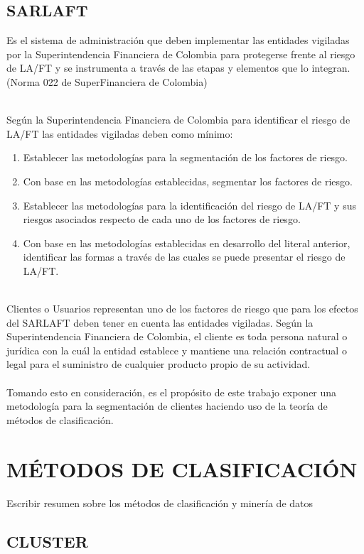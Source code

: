 \documentclass[letterpaper,12pt, spanish]{article}
\begin{document}
\subsection{SARLAFT}

Es el sistema de administración que deben implementar las entidades vigiladas por la Superintendencia Financiera de Colombia para protegerse frente al riesgo de LA/FT y se instrumenta a través de las etapas y elementos que lo integran. (Norma 022 de SuperFinanciera de Colombia)

\ \\
Según la Superintendencia Financiera de Colombia para identificar el riesgo de LA/FT las entidades vigiladas deben como mínimo:
\begin{enumerate}
  \item Establecer las metodologías para la segmentación de los factores de riesgo.
  \item Con base en las metodologías establecidas, segmentar los factores de riesgo.
  \item Establecer las metodologías para la identificación del riesgo de LA/FT y sus riesgos asociados respecto de cada uno de los factores de riesgo.
  \item Con base en las metodologías establecidas en desarrollo del literal anterior, identificar las formas a
      través de las cuales se puede presentar el riesgo de LA/FT.
\end{enumerate}
\ \\
Clientes o Usuarios representan uno de los factores de riesgo que para los efectos del SARLAFT deben tener en cuenta las entidades vigiladas. Según la Superintendencia Financiera de Colombia, el cliente es toda persona natural o jurídica con la cuál la entidad establece y mantiene una relación contractual o legal para el suministro de cualquier producto propio de su actividad.
\ \\
\ \\
Tomando esto en consideración, es el propósito de este trabajo exponer una metodología para la segmentación de clientes haciendo uso de la teoría de métodos de clasificación.

\section{MÉTODOS DE CLASIFICACIÓN}

Escribir resumen sobre los métodos de clasificación y minería de datos


\subsection{CLUSTER}
\end{document}
